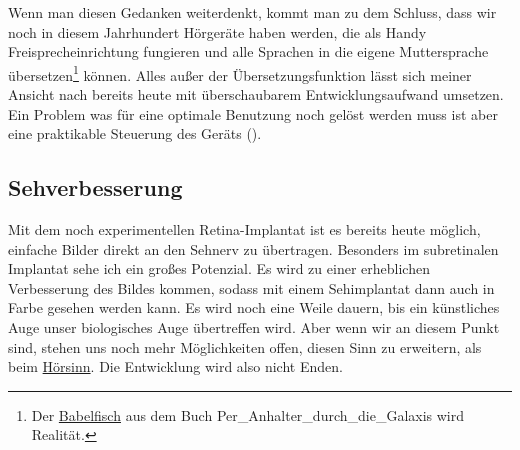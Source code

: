 Wenn man diesen Gedanken weiterdenkt, kommt man zu dem Schluss, dass wir noch in diesem Jahrhundert
Hörgeräte haben werden, die als Handy Freisprecheinrichtung fungieren und alle
\label{sec:Robin:future:hearing:Babel_Fish}%
Sprachen in die
eigene Muttersprache übersetzen\footnote{Der
\href{http://de.wikipedia.org/wiki/Babelfisch}{Babelfisch} aus dem Buch \citetitle
{Per_Anhalter_durch_die_Galaxis} wird Realität.} können. Alles außer der Übersetzungsfunktion lässt
sich meiner Ansicht nach bereits
heute mit überschaubarem Entwicklungsaufwand umsetzen. Ein Problem was für eine optimale Benutzung
noch gelöst werden muss ist aber eine praktikable Steuerung des Geräts
().

\subsection{Sehverbesserung}
Mit dem noch experimentellen Retina-Implantat ist es bereits heute möglich, einfache Bilder direkt
an den Sehnerv zu übertragen. Besonders im subretinalen Implantat sehe ich ein großes Potenzial. Es
wird zu einer erheblichen Verbesserung des Bildes kommen, sodass mit einem Sehimplantat dann auch in
Farbe gesehen werden kann. Es wird noch eine Weile dauern, bis ein künstliches Auge unser
biologisches Auge übertreffen wird. Aber wenn wir an diesem Punkt sind, stehen uns noch mehr
Möglichkeiten offen, diesen Sinn zu erweitern, als beim
\hyperref[sec:Robin:future:hearing]{Hörsinn}. Die Entwicklung wird also nicht
Enden.

